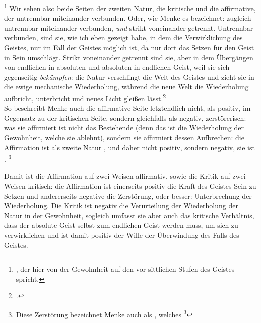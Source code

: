 \documentclass[12pt, a4paper, openany]{report}
\begin{document}
\footnote{
    \cite[Vgl. z.B.][§88, S. 433]{khurana_freiheit_2017}, der hier von der Gewohnheit auf den vor-sittlichen Stufen des Geistes spricht.
}
Wir sehen also beide Seiten der zweiten Natur, die kritische und die affirmative, der untrennbar miteinander verbunden. 
Oder, wie Menke es bezeichnet: zugleich untrennbar miteinander verbunden, \emph{und} strikt voneinander getrennt.
Untrennbar verbunden, sind sie, wie ich eben gezeigt habe, in dem die Verwirklichung des Geistes, nur im Fall der Geistes möglich ist, da nur dort das Setzen für den Geist in Sein umschlägt. 
Strikt voneinander getrennt sind sie, aber in dem Übergängen von endlichen in absoluten und absoluten in endlichen Geist, weil sie sich gegenseitig \emph{bekämpfen}:
die Natur verschlingt die Welt des Geistes und zieht sie in die ewige mechanische Wiederholung, während die neue Welt die Wiederholung aufbricht, unterbricht und neues Licht gleißen lässt.\footcite[Vgl.][147]{menke_autonomie_2018}\\
So beschreibt Menke auch die affirmative Seite letztendlich nicht, als positiv, im Gegensatz zu der kritischen Seite, sondern gleichfalls als negativ, zerstörerisch:
was sie affirmiert ist nicht das Bestehende (denn das ist die Wiederholung der Gewohnheit, welche sie ablehnt), sondern sie affirmiert dessen Aufbrechen: 
die Affirmation ist als  zweite Natur , und daher nicht positiv, sondern negativ, sie ist .%
\footnote{
    \cite[][S. 148. Hervorhebung von mir.]{menke_autonomie_2018}
    Diese Zerstörung bezeichnet Menke auch als , welches \footcite[][147]{menke_autonomie_2018}
}

Damit ist die Affirmation auf zwei Weisen affirmativ, sowie die Kritik auf zwei Weisen kritisch: 
die Affirmation ist einerseits positiv die Kraft des Geistes Sein zu Setzen und andererseits negative die Zerstörung, oder besser: Unterbrechung der Wiederholung. 
Die Kritik ist negativ die Verurteilung der Wiederholung der Natur in der Gewohnheit, sogleich umfasst sie aber auch das kritische Verhältnis, dass der absolute Geist selbst zum endlichen Geist werden muss, um sich zu verwirklichen und ist damit positiv der Wille der Überwindung des Falls des Geistes.\\
\end{document}
